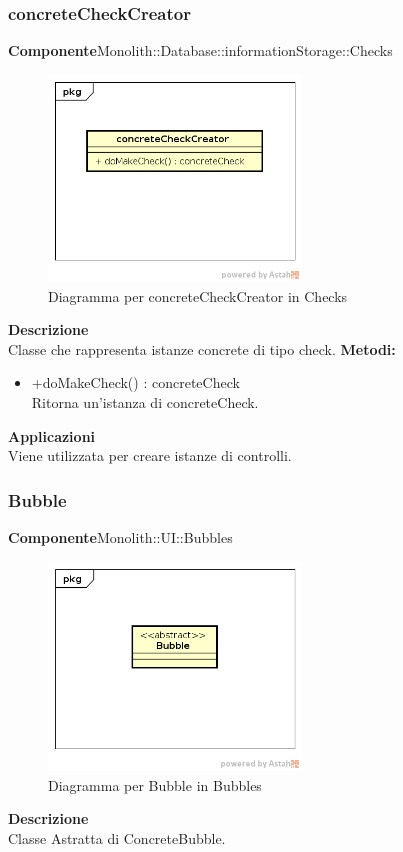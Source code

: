\subsubsection{concreteCheckCreator}
\textbf{Componente}Monolith::Database::informationStorage::Checks\\
   \FloatBarrier
   \begin{figure}[ht]
   \centering
   \includegraphics[width=0.6\textwidth]{img/single-concreteCheckCreator}
   \caption{{Diagramma per concreteCheckCreator in Checks}}
\end{figure}
\FloatBarrier
\textbf{Descrizione}\\
Classe che rappresenta istanze concrete di tipo check.
\textbf{Metodi:} \begin{itemize}\item +doMakeCheck() : concreteCheck \\Ritorna un'istanza di concreteCheck.\end{itemize} 


\textbf{Applicazioni}\\
Viene utilizzata per creare istanze di controlli. 


\clearpage

\subsubsection{Bubble}
\textbf{Componente}Monolith::UI::Bubbles\\
   \FloatBarrier
   \begin{figure}[ht]
   \centering
   \includegraphics[width=0.6\textwidth]{img/single-Bubble}
   \caption{{Diagramma per Bubble in Bubbles}}
\end{figure}
\FloatBarrier
\textbf{Descrizione}\\
Classe Astratta di ConcreteBubble. 


